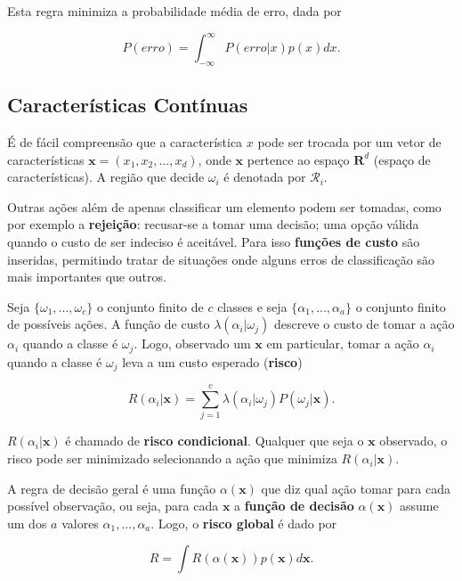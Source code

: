 \documentclass[a4paper,12pt,twocolumn]{article}
\begin{document}
Esta regra minimiza a probabilidade média de erro, dada por

\begin{equation}
    P(erro) = \int_{-\infty}^{\infty} P(erro|x)p(x) dx.
    \label{eq:bayes}
\end{equation}

\subsection{Características Contínuas}

É de fácil compreensão que a característica $x$ pode ser trocada por um vetor de características $\mathbf{x} = (x_1, x_2, ..., x_d)$, onde $\mathbf{x}$ pertence ao espaço $\mathbf{R}^d$ (espaço de características). A região que decide $\omega_i$ é denotada por $\mathcal{R}_i$.

Outras ações além de apenas classificar um elemento podem ser tomadas, como por exemplo a \textbf{rejeição}: recusar-se a tomar uma decisão; uma opção válida quando o custo de ser indeciso é aceitável. Para isso \textbf{funções de custo} são inseridas, permitindo tratar de situações onde alguns erros de classificação são mais importantes que outros.

Seja $\{\omega_1, ..., \omega_c\}$ o conjunto finito de $c$ classes e seja $\{\alpha_1, ..., \alpha_a\}$ o conjunto finito de possíveis ações. A função de custo $\lambda(\alpha_i|\omega_j)$ descreve o custo de tomar a ação $\alpha_i$ quando a classe é $\omega_j$. Logo, observado um $\mathbf{x}$ em particular, tomar a ação $\alpha_i$ quando a classe é $\omega_j$ leva a um custo esperado (\textbf{risco})

\begin{equation}
    R(\alpha_i|\mathbf{x}) = \sum_{j=1}^c \lambda(\alpha_i|\omega_j) P(\omega_j|\mathbf{x}).
    \label{eq:conditional_risk}
\end{equation}

$R(\alpha_i|\mathbf{x})$ é chamado de \textbf{risco condicional}. Qualquer que seja o $\mathbf{x}$ observado, o risco pode ser minimizado selecionando a ação que minimiza $R(\alpha_i|\mathbf{x})$.

A regra de decisão geral é uma função $\alpha(\mathbf{x})$ que diz qual ação tomar para cada possível observação, ou seja, para cada $\mathbf{x}$ a \textbf{função de decisão} $\alpha(\mathbf{x})$ assume um dos $a$ valores $\alpha_1, ..., \alpha_a$. Logo, o \textbf{risco global} é dado por

\begin{equation}
    R = \int R(\alpha(\mathbf{x}))p(\mathbf{x})d\mathbf{x}.
    \label{eq:conditional_risk}
\end{equation}
\end{document}
